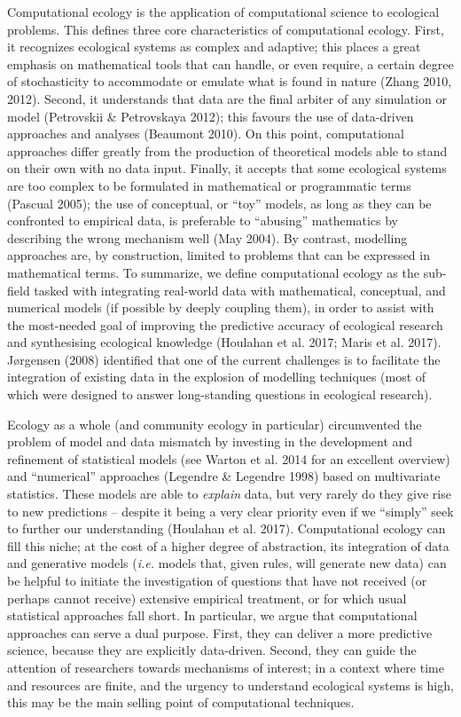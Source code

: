 \documentclass[12pt]{article}
\begin{document}
Computational ecology is the application of computational science to
ecological problems. This defines three core characteristics of
computational ecology. First, it recognizes ecological systems as
complex and adaptive; this places a great emphasis on mathematical tools
that can handle, or even require, a certain degree of stochasticity to
accommodate or emulate what is found in nature (Zhang 2010, 2012).
Second, it understands that data are the final arbiter of any simulation
or model (Petrovskii \& Petrovskaya 2012); this favours the use of
data-driven approaches and analyses (Beaumont 2010). On this point,
computational approaches differ greatly from the production of
theoretical models able to stand on their own with no data input.
Finally, it accepts that some ecological systems are too complex to be
formulated in mathematical or programmatic terms (Pascual 2005); the use
of conceptual, or \enquote{toy} models, as long as they can be
confronted to empirical data, is preferable to \enquote{abusing}
mathematics by describing the wrong mechanism well (May 2004). By
contrast, modelling approaches are, by construction, limited to problems
that can be expressed in mathematical terms. To summarize, we define
computational ecology as the sub-field tasked with integrating
real-world data with mathematical, conceptual, and numerical models (if
possible by deeply coupling them), in order to assist with the
most-needed goal of improving the predictive accuracy of ecological
research and synthesising ecological knowledge (Houlahan et al. 2017;
Maris et al. 2017). Jørgensen (2008) identified that one of the current
challenges is to facilitate the integration of existing data in the
explosion of modelling techniques (most of which were designed to answer
long-standing questions in ecological research).

Ecology as a whole (and community ecology in particular) circumvented
the problem of model and data mismatch by investing in the development
and refinement of statistical models (see Warton et al. 2014 for an
excellent overview) and \enquote{numerical} approaches (Legendre \&
Legendre 1998) based on multivariate statistics. These models are able
to \emph{explain} data, but very rarely do they give rise to new
predictions -- despite it being a very clear priority even if we
\enquote{simply} seek to further our understanding (Houlahan et al.
2017). Computational ecology can fill this niche; at the cost of a
higher degree of abstraction, its integration of data and generative
models (\emph{i.e.} models that, given rules, will generate new data)
can be helpful to initiate the investigation of questions that have not
received (or perhaps cannot receive) extensive empirical treatment, or
for which usual statistical approaches fall short. In particular, we
argue that computational approaches can serve a dual purpose. First,
they can deliver a more predictive science, because they are explicitly
data-driven. Second, they can guide the attention of researchers towards
mechanisms of interest; in a context where time and resources are
finite, and the urgency to understand ecological systems is high, this
may be the main selling point of computational techniques.
\end{document}
